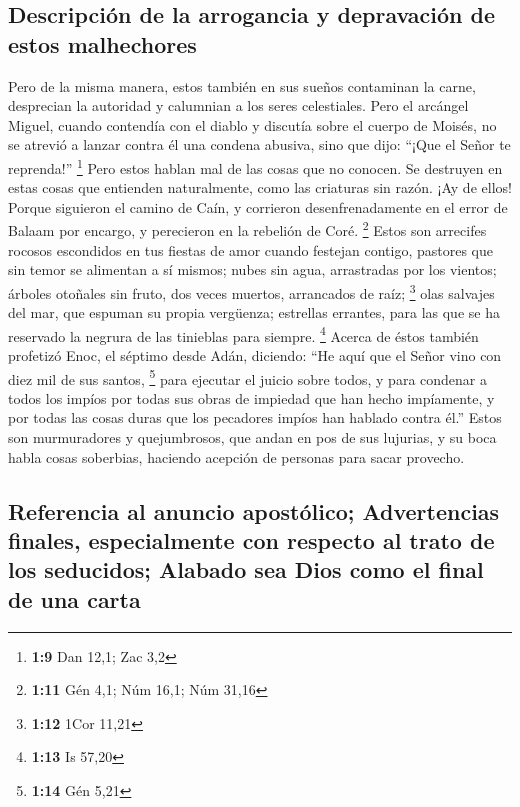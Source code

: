 \hypertarget{descripciuxf3n-de-la-arrogancia-y-depravaciuxf3n-de-estos-malhechores}{%
\subsection{Descripción de la arrogancia y depravación de estos
malhechores}\label{descripciuxf3n-de-la-arrogancia-y-depravaciuxf3n-de-estos-malhechores}}

 Pero de la misma manera, estos también en sus sueños
contaminan la carne, desprecian la autoridad y calumnian a los seres
celestiales.  Pero el arcángel Miguel, cuando contendía
con el diablo y discutía sobre el cuerpo de Moisés, no se atrevió a
lanzar contra él una condena abusiva, sino que dijo: ``¡Que el Señor te
reprenda!'' \footnote{\textbf{1:9} Dan 12,1; Zac 3,2} 
Pero estos hablan mal de las cosas que no conocen. Se destruyen en estas
cosas que entienden naturalmente, como las criaturas sin razón.
 ¡Ay de ellos! Porque siguieron el camino de Caín, y
corrieron desenfrenadamente en el error de Balaam por encargo, y
perecieron en la rebelión de Coré. \footnote{\textbf{1:11} Gén 4,1; Núm
  16,1; Núm 31,16}  Estos son arrecifes rocosos
escondidos en tus fiestas de amor cuando festejan contigo, pastores que
sin temor se alimentan a sí mismos; nubes sin agua, arrastradas por los
vientos; árboles otoñales sin fruto, dos veces muertos, arrancados de
raíz; \footnote{\textbf{1:12} 1Cor 11,21}  olas salvajes
del mar, que espuman su propia vergüenza; estrellas errantes, para las
que se ha reservado la negrura de las tinieblas para siempre.
\footnote{\textbf{1:13} Is 57,20}  Acerca de éstos
también profetizó Enoc, el séptimo desde Adán, diciendo: ``He aquí que
el Señor vino con diez mil de sus santos, \footnote{\textbf{1:14} Gén
  5,21}  para ejecutar el juicio sobre todos, y para
condenar a todos los impíos por todas sus obras de impiedad que han
hecho impíamente, y por todas las cosas duras que los pecadores impíos
han hablado contra él.''  Estos son murmuradores y
quejumbrosos, que andan en pos de sus lujurias, y su boca habla cosas
soberbias, haciendo acepción de personas para sacar provecho.

\hypertarget{referencia-al-anuncio-apostuxf3lico-advertencias-finales-especialmente-con-respecto-al-trato-de-los-seducidos-alabado-sea-dios-como-el-final-de-una-carta}{%
\subsection{Referencia al anuncio apostólico; Advertencias finales,
especialmente con respecto al trato de los seducidos; Alabado sea Dios
como el final de una
carta}\label{referencia-al-anuncio-apostuxf3lico-advertencias-finales-especialmente-con-respecto-al-trato-de-los-seducidos-alabado-sea-dios-como-el-final-de-una-carta}}

